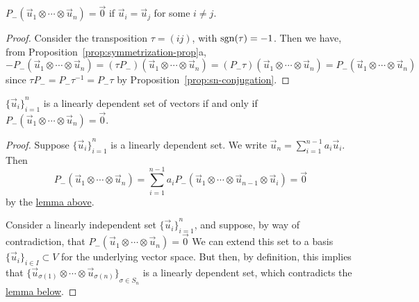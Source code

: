 \begin{lemma}\label{lem:antisym-same-zero}
    \(P_-(\vec{u}_1 \otimes \cdots \otimes \vec{u}_n) = \vec{0}\)
    if \(\vec{u}_i = \vec{u}_j\) for some \(i \neq j\).
\end{lemma}
\begin{proof}
    Consider the transposition \(\tau = (ij)\), with \(\operatorname{sgn}(\tau) = -1\).
    Then we have, from Proposition~\ref{prop:symmetrization-prop}a,
    \begin{equation*}
        -P_-(\vec{u}_1 \otimes \cdots \otimes \vec{u}_n)
        = (\tau P_-)(\vec{u}_1 \otimes \cdots \otimes \vec{u}_n)
        = (P_- \tau)(\vec{u}_1 \otimes \cdots \otimes \vec{u}_n)
        = P_- (\vec{u}_1 \otimes \cdots \otimes \vec{u}_n)
    \end{equation*}
    since \(\tau P_- = P_- \tau^{-1} = P_- \tau\) by Proposition~\ref{prop:sn-conjugation}.
\end{proof}
\begin{theorem}\label{thm:antisym-lin-dep-zero}
    \({\{\vec{u}_i\}}_{i=1}^n\) is a linearly dependent set of vectors
    if and only if \(P_-(\vec{u}_1 \otimes \cdots \otimes \vec{u}_n) = \vec{0}\).
\end{theorem}
\begin{proof}
    Suppose \({\{\vec{u}_i\}}_{i=1}^n\) is a linearly dependent set.
    We write \(\vec{u}_n = \sum_{i=1}^{n-1} a_i\vec{u}_i\).
    Then
    \begin{equation*}
        P_-(\vec{u}_1 \otimes \cdots \otimes \vec{u}_n)
        = \sum_{i=1}^{n-1} a_i P_-(\vec{u}_1 \otimes \cdots \otimes \vec{u}_{n-1} \otimes \vec{u}_i)
        = \vec{0}
    \end{equation*}
    by the \hyperref[lem:antisym-same-zero]{lemma above}.
    
    Consider a linearly independent set \({\{\vec{u}_i\}}_{i=1}^n\),
    and suppose, by way of contradiction, that \(P_-(\vec{u}_1 \otimes \cdots \otimes \vec{u}_n) = \vec{0}\)
    We can extend this set to a basis \({\{\vec{u}_i\}}_{i \in I} \subset V\)
    for the underlying vector space.
    But then, by definition, this implies that
    \({\{\vec{u}_{\sigma(1)} \otimes \cdots \otimes \vec{u}_{\sigma(n)}\}}_{\sigma \in S_n}\)
    is a linearly dependent set,
    which contradicts the \hyperref[lem:tensor-n-basis]{lemma below}.
\end{proof}

